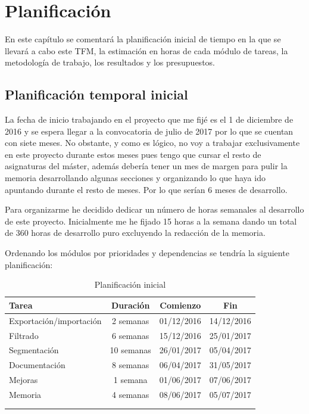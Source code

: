 \chapter{Planificación}

En este capítulo se comentará la planificación inicial de tiempo en la que se llevará a cabo este TFM, la estimación en horas de cada módulo de tareas, la metodología de trabajo, los resultados y los presupuestos.

\section{Planificación temporal inicial}

La fecha de inicio trabajando en el proyecto que me fijé es el 1 de diciembre de 2016 y se espera llegar a la convocatoria de julio de 2017 por lo que se cuentan con siete meses. No obstante, y como es lógico, no voy a trabajar exclusivamente en este proyecto durante estos meses pues tengo que cursar el resto de asignaturas del máster, además debería tener un mes de margen para pulir la memoria desarrollando algunas secciones y organizando lo que haya ido apuntando durante el resto de meses. Por lo que serían 6 meses de desarrollo.

Para organizarme he decidido dedicar un número de horas semanales al desarrollo de este proyecto. Inicialmente me he fijado 15 horas a la semana dando un total de 360 horas de desarrollo puro excluyendo la redacción de la memoria.

Ordenando los módulos por prioridades y dependencias se tendría la siguiente planificación:

\begin{longtable} {l c c c}
	\hline
	\textbf{Tarea}			&	\textbf{Duración}	&	\textbf{Comienzo}	&	\textbf{Fin}	\\
	\hline \hline
	\endhead
	\hline 
	Exportación/importación	&	2 semanas			&	01/12/2016			&	14/12/2016		\\
	\hline
	Filtrado				&	6 semanas			&	15/12/2016			&	25/01/2017		\\
	\hline
	Segmentación			&	10 semanas			&	26/01/2017			&	05/04/2017		\\
	\hline
	Documentación			&	8 semanas			&	06/04/2017			&	31/05/2017		\\
	\hline
	Mejoras					&	1 semana			&	01/06/2017			&	07/06/2017		\\
	\hline
	Memoria					&	4 semanas			&	08/06/2017			&	05/07/2017		\\
	\hline
	\\
	\caption{Planificación inicial}
	\label{tab:planificacion/planificacion-inicial}
\end{longtable}

